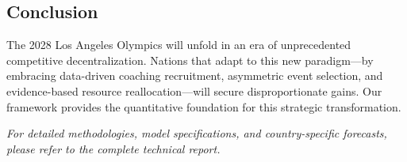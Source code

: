 \documentclass{mcmthesis}
\begin{document}
\subsection*{Conclusion}

The 2028 Los Angeles Olympics will unfold in an era of unprecedented competitive decentralization. Nations that adapt to this new paradigm—by embracing data-driven coaching recruitment, asymmetric event selection, and evidence-based resource reallocation—will secure disproportionate gains. Our framework provides the quantitative foundation for this strategic transformation.

\vspace{1em}
\noindent\textit{For detailed methodologies, model specifications, and country-specific forecasts, please refer to the complete technical report.}
\end{document}
